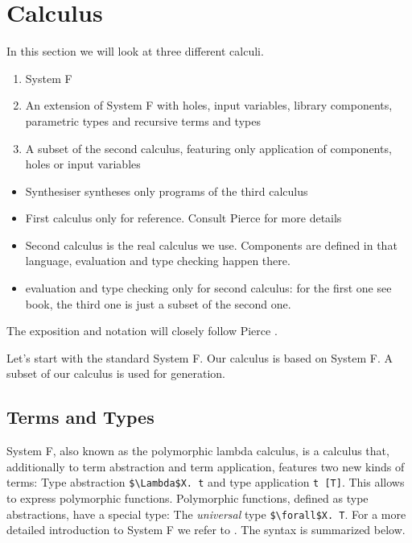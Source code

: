 \section{Calculus}
In this section we will look at three different calculi.
\begin{enumerate}[1.]
\item System F
\item An extension of System F with holes, input variables, library components, parametric types and recursive terms and types
\item A subset of the second calculus, featuring only application of components, holes or input variables
\end{enumerate}


\begin{itemize}
\item Synthesiser syntheses only programs of the third calculus
\item First calculus only for reference. Consult Pierce \cite{pierce2002types} for more details
\item Second calculus is the real calculus we use. Components are defined in that language, evaluation and type checking happen there.
\item evaluation and type checking only for second calculus: for the first one see book, the third one is just a subset of the second one.
\end{itemize}

The exposition and notation will closely follow  Pierce \cite{pierce2002types}.

Let's start with the standard System F.
Our calculus is based on System F. A subset of our calculus is used for generation.

  \subsection{Terms and Types}\label{Term and types}
System F, also known as the polymorphic lambda calculus, is a calculus that, additionally to term abstraction and term application, features two new kinds of terms: Type abstraction \lstinline!$\Lambda$X. t! and type application \lstinline!t [T]!. This allows to express polymorphic functions. Polymorphic functions, defined as type abstractions, have a special type: The \emph{universal} type \lstinline!$\forall$X. T!. For a more detailed introduction to System F we refer to \cite{pierce2002types}. The syntax is summarized below.

